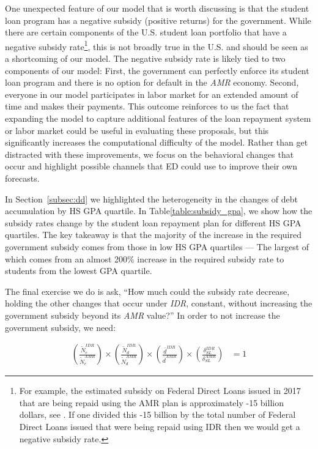   One unexpected feature of our model that is worth discussing is that the student loan program has
  a negative subsidy (positive returns) for the government. While there are certain components of
  the U.S. student loan portfolio that have a negative subsidy rate\footnote{For example, the
  estimated subsidy on Federal Direct Loans issued in 2017 that are being repaid using the AMR plan
  is approximately -15 billion dollars, see \cite{GAO-17-22}. If one divided this -15 billion by the
  total number of Federal Direct Loans issued that were being repaid using IDR then we would get a
  negative subsidy rate.}, this is not broadly true in the U.S. and should be seen as a shortcoming
  of our model. The negative subsidy rate is likely tied to two components of our model: First, the
  government can perfectly enforce its student loan program and there is no option for default in
  the \textit{AMR} economy. Second, everyone in our model participates in labor market for an
  extended amount of time and makes their payments. This outcome reinforces to us the fact that
  expanding the model to capture additional features of the loan repayment system or labor market
  could be useful in evaluating these proposals, but this significantly increases the computational
  difficulty of the model. Rather than get distracted with these improvements, we focus on the
  behavioral changes that occur and highlight possible channels that ED could use to improve their
  own forecasts.

  In Section~\ref{subsec:dd} we highlighted the heterogeneity in the changes of debt accumulation
  by HS GPA quartile. In Table\ref{table:subsidy_gpa}, we show how the subsidy rates change by the
  student loan repayment plan for different HS GPA quartiles. The key takeaway is that the majority
  of the increase in the required government subsidy comes from those in low HS GPA quartiles ---
  The largest of which comes from an almost 200\% increase in the required subsidy rate to students
  from the lowest GPA quartile.

  The final exercise we do is ask, ``How much could the subsidy rate decrease, holding the other
  changes that occur under \textit{IDR}, constant, without increasing the government subsidy beyond
  its \textit{AMR} value?'' In order to not increase the government subsidy, we need:

  \begin{align*}
      \left( \frac{\tilde{N}^{IDR}_e}{\tilde{N}^{AMR}_e} \right) \times
      \left( \frac{\tilde{N}^{IDR}_d}{\tilde{N}^{AMR}_d} \right) \times
      \left( \frac{\bar{d}^{IDR}}{\bar{d}^{AMR}} \right) \times
      \left( \frac{\delta^{IDR}_{SL}}{\delta^{AMR}_{SL}} \right) &= 1
  \end{align*}

